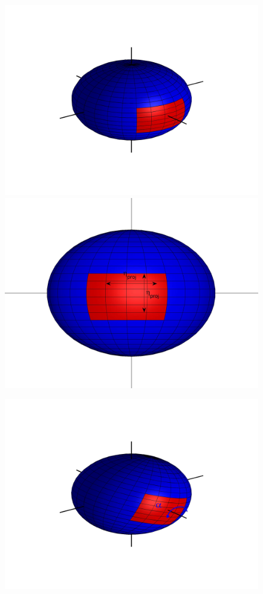 \documentclass{pnastwo}
\begin{document}
\begin{figure}
\begin{minipage}{0.2\textwidth}
\centering
\includegraphics[width=\textwidth]{sphere_1}\\
\includegraphics[width=\textwidth]{sphere2_1}\\
\end{minipage}
%
\begin{minipage}{0.2\textwidth}
\centering
\includegraphics[width=\textwidth]{sphere_2}\\

\end{minipage}
\end{figure}
\end{document}
